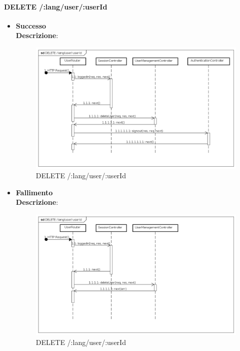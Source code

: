 
\paragraph{DELETE /:lang/user/:userId}
\begin{itemize}
\item \textbf{Successo} \\
	\textbf{Descrizione}:

\begin{figure}[ht]
	\centering
	\includegraphics[scale=0.45]{UML/DiagrammiDiSequenza/Back-end/DELETE __lang_user__userId_success.png}
	\caption{DELETE /:lang/user/:userId}
\end{figure}
\FloatBarrier

\item \textbf{Fallimento} \\
	\textbf{Descrizione}:

\begin{figure}[ht]
	\centering
	\includegraphics[scale=0.45]{UML/DiagrammiDiSequenza/Back-end/DELETE __lang_user__userId_failure.png}
	\caption{DELETE /:lang/user/:userId}
\end{figure}
\FloatBarrier


\end{itemize}


